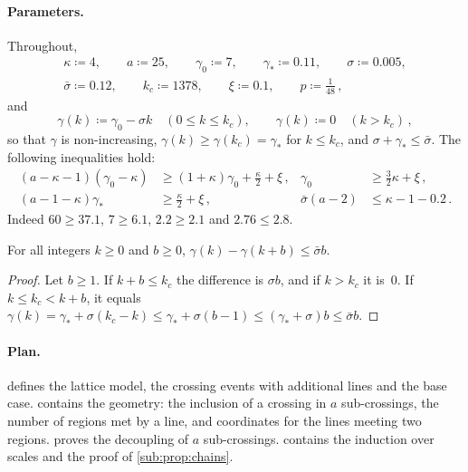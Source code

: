 \documentclass[11pt,letterpaper]{article}
\begin{document}
\paragraph{Parameters.} Throughout,
\begin{equation}
\label{sub:eq:param}
\begin{gathered}
  \kappa\coloneqq4,\qquad a\coloneqq25,\qquad\gamma_0\coloneqq7,\qquad\gamma_*\coloneqq0.11,\qquad\sigma\coloneqq0.005,\\
  \bar\sigma\coloneqq0.12,\qquad k_c\coloneqq1378,\qquad\xi\coloneqq0.1,\qquad p\coloneqq\tfrac1{48}\,,
\end{gathered}
\end{equation}
and
\begin{equation}
\label{sub:eq:gamma}
  \gamma(k)\coloneqq\gamma_0-\sigma k\quad(0\le k\le k_c),\qquad\gamma(k)\coloneqq0\quad(k>k_c)\,,
\end{equation}
so that $\gamma$ is non-increasing, $\gamma(k)\ge\gamma(k_c)=\gamma_*$ for $k\le k_c$, and $\sigma+\gamma_*\le\bar\sigma$. The following inequalities hold:
\begin{align}
\label{sub:eq:P1}
  (a-\kappa-1)(\gamma_0-\kappa)&\ge(1+\kappa)\gamma_0+\tfrac\kappa2+\xi\,,&\gamma_0&\ge\tfrac32\kappa+\xi\,,\\
\label{sub:eq:P3}
  (a-1-\kappa)\gamma_*&\ge\tfrac\kappa2+\xi\,,&\bar\sigma(a-2)&\le\kappa-1-0.2\,.
\end{align}
Indeed $60\ge37.1$, $7\ge6.1$, $2.2\ge2.1$ and $2.76\le2.8$.

\begin{lemma}[Profile]
\label{sub:lem:profile}
For all integers $k\ge0$ and $b\ge0$, $\gamma(k)-\gamma(k+b)\le\bar\sigma b$.
\end{lemma}

\begin{proof}
Let $b\ge1$. If $k+b\le k_c$ the difference is $\sigma b$, and if $k>k_c$ it is~$0$. If $k\le k_c<k+b$, it equals $\gamma(k)=\gamma_*+\sigma(k_c-k)\le\gamma_*+\sigma(b-1)\le(\gamma_*+\sigma)b\le\bar\sigma b$.
\end{proof}

\paragraph{Plan.}  defines the lattice model, the crossing events with additional lines and the base case.  contains the geometry: the inclusion of a crossing in $a$ sub-crossings, the number of regions met by a line, and coordinates for the lines meeting two regions.  proves the decoupling of $a$ sub-crossings.  contains the induction over scales and the proof of \cref{sub:prop:chains}.
\end{document}
